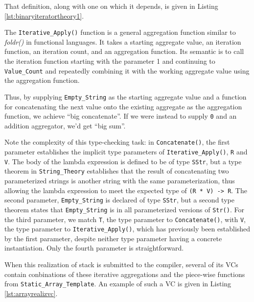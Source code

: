 That definition, along with one on which it depends, is given in Listing \ref{lst:binaryiteratortheory1}.



The \texttt{Iterative\_Apply()} function is a general aggregation function similar to \emph{foldr()} in functional languages.  It takes a starting aggregate value, an iteration function, an iteration count, and an aggregation function. Its semantic is to call the iteration function starting with the parameter 1 and continuing to \texttt{Value\_Count} and repeatedly combining it with the working aggregate value using the aggregation function.

Thus, by supplying \texttt{Empty\_String} as the starting aggregate value and a function for concatenating the next value onto the existing aggregate as the aggregation function, we achieve ``big concatenate''.  If we were instead to supply \texttt{0} and an addition aggregator, we'd get ``big sum''.

Note the complexity of this type-checking task: in \texttt{Concatenate()}, the first parameter establishes the implicit type parameters of \texttt{Iterative\_Apply()}, \texttt{R} and \texttt{V}.  The body of the lambda expression is defined to be of type \texttt{SStr}, but a type theorem in \texttt{String\_Theory} establishes that the result of concatenating two parameterized strings is another string with the same parameterization, thus allowing the lambda expression to meet the expected type of \texttt{(R * V) -> R}.  The second parameter, \texttt{Empty\_String} is declared of type \texttt{SStr}, but a second type theorem states that \texttt{Empty\_String} is in all parameterized versions of \texttt{Str()}.  For the third parameter, we match \texttt{T}, the type parameter to \texttt{Concatenate()}, with \texttt{V}, the type parameter to \texttt{Iterative\_Apply()}, which has previously been established by the first parameter, despite neither type parameter having a concrete instantiation.  Only the fourth parameter is straightforward.

When this realization of stack is submitted to the compiler, several of its VCs contain conbinations of these iterative aggregations and the piece-wise functions from \texttt{Static\_Array\_Template}.  An example of such a VC is given in Listing \ref{lst:arrayrealizvc}.



